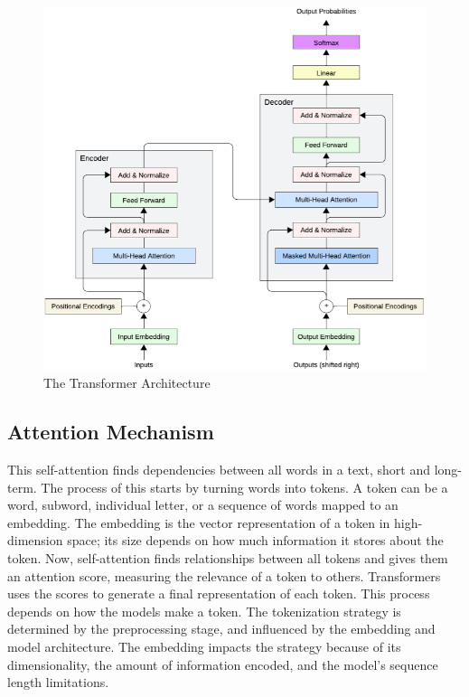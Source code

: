 \begin{figure}[!hb]
    \centering
        \includegraphics[width=1\linewidth]{images/transformers_architecture.png}
        \caption{The Transformer Architecture}
        \label{transformer}
\end{figure}

\subsection{Attention Mechanism}
This self-attention finds dependencies between all words in a text, short and long-term. The process of this starts by turning words into tokens. A token can be a word, subword, individual letter, or a sequence of words mapped to an embedding. The embedding is the vector representation of a token in high-dimension space; its size depends on how much information it stores about the token. Now, self-attention finds relationships between all tokens and gives them an attention score, measuring the relevance of a token to others. Transformers uses the scores to generate a final representation of each token. This process depends on how the models make a token. The tokenization strategy is determined by the preprocessing stage, and influenced by the embedding and model architecture. The embedding impacts the strategy because of its dimensionality, the amount of information encoded, and the model's sequence length limitations. 


